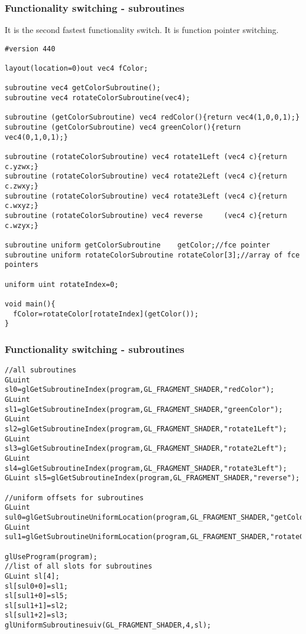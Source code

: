 \begin{frame}[fragile]
\frametitle{Functionality switching - subroutines}
  It is the second fastest functionality switch. It is function pointer switching.
{\tiny
\begin{verbatim}
#version 440

layout(location=0)out vec4 fColor;

subroutine vec4 getColorSubroutine();
subroutine vec4 rotateColorSubroutine(vec4);

subroutine (getColorSubroutine) vec4 redColor(){return vec4(1,0,0,1);}
subroutine (getColorSubroutine) vec4 greenColor(){return vec4(0,1,0,1);}

subroutine (rotateColorSubroutine) vec4 rotate1Left (vec4 c){return c.yzwx;}
subroutine (rotateColorSubroutine) vec4 rotate2Left (vec4 c){return c.zwxy;}
subroutine (rotateColorSubroutine) vec4 rotate3Left (vec4 c){return c.wxyz;}
subroutine (rotateColorSubroutine) vec4 reverse     (vec4 c){return c.wzyx;}

subroutine uniform getColorSubroutine    getColor;//fce pointer
subroutine uniform rotateColorSubroutine rotateColor[3];//array of fce pointers

uniform uint rotateIndex=0;

void main(){
  fColor=rotateColor[rotateIndex](getColor());
}
\end{verbatim}
}
\end{frame}

\begin{frame}[fragile]
\frametitle{Functionality switching - subroutines}
{\tiny
\begin{verbatim}
//all subroutines
GLuint sl0=glGetSubroutineIndex(program,GL_FRAGMENT_SHADER,"redColor");
GLuint sl1=glGetSubroutineIndex(program,GL_FRAGMENT_SHADER,"greenColor");
GLuint sl2=glGetSubroutineIndex(program,GL_FRAGMENT_SHADER,"rotate1Left");
GLuint sl3=glGetSubroutineIndex(program,GL_FRAGMENT_SHADER,"rotate2Left");
GLuint sl4=glGetSubroutineIndex(program,GL_FRAGMENT_SHADER,"rotate3Left");
GLuint sl5=glGetSubroutineIndex(program,GL_FRAGMENT_SHADER,"reverse");

//uniform offsets for subroutines
GLuint sul0=glGetSubroutineUniformLocation(program,GL_FRAGMENT_SHADER,"getColor");
GLuint sul1=glGetSubroutineUniformLocation(program,GL_FRAGMENT_SHADER,"rotateColor");

glUseProgram(program);
//list of all slots for subroutines
GLuint sl[4];
sl[sul0+0]=sl1;
sl[sul1+0]=sl5;
sl[sul1+1]=sl2;
sl[sul1+2]=sl3;
glUniformSubroutinesuiv(GL_FRAGMENT_SHADER,4,sl);
\end{verbatim}
}
\end{frame}

